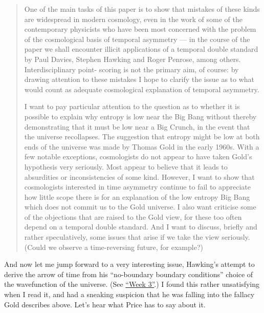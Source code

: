 \documentclass{article}
\begin{document}
\begin{quote}
One of the main tasks of this paper is to show that mistakes of these
kinds are widespread in modern cosmology, even in the work of some of
the contemporary physicists who have been most concerned with the
problem of the cosmological basis of temporal asymmetry --- in the
course of the paper we shall encounter illicit applications of a
temporal double standard by Paul Davies, Stephen Hawking and Roger
Penrose, among others. Interdisciplinary point- scoring is not the
primary aim, of course: by drawing attention to these mistakes I hope to
clarify the issue as to what would count as adequate cosmological
explanation of temporal asymmetry.

I want to pay particular attention to the question as to whether it is
possible to explain why entropy is low near the Big Bang without thereby
demonstrating that it must be low near a Big Crunch, in the event that
the universe recollapses. The suggestion that entropy might be low at
both ends of the universe was made by Thomas Gold in the early 1960s.
With a few notable exceptions, cosmologists do not appear to have taken
Gold's hypothesis very seriously. Most appear to believe that it leads
to absurdities or inconsistencies of some kind. However, I want to show
that cosmologists interested in time asymmetry continue to fail to
appreciate how little scope there is for an explanation of the low
entropy Big Bang which does not commit us to the Gold universe. I also
want criticise some of the objections that are raised to the Gold view,
for these too often depend on a temporal double standard. And I want to
discuss, briefly and rather speculatively, some issues that arise if we
take the view seriously. (Could we observe a time-reversing future, for
example?)
\end{quote}

And now let me jump forward to a very interesting issue, Hawking's
attempt to derive the arrow of time from his ``no-boundary boundary
conditions'' choice of the wavefunction of the universe. (See
\protect\hyperlink{week3}{``Week 3''}.) I found this rather unsatisfying
when I read it, and had a sneaking suspicion that he was falling into
the fallacy Gold describes above. Let's hear what Price has to say about
it.
\end{document}
